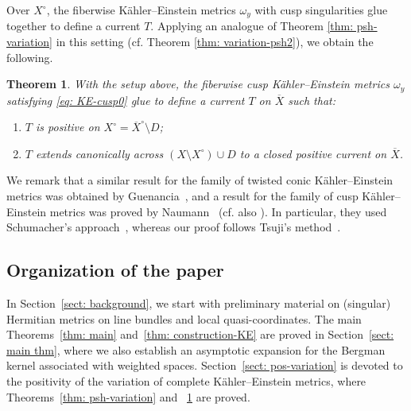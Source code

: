 \documentclass[a4paper, 11pt]{amsart}
\theoremstyle{plain}
\newtheorem{theorem}{Theorem}[section]
\numberwithin{equation}{section} %
\numberwithin{figure}{section} %
\theoremstyle{plain}
\theoremstyle{plain}
\theoremstyle{plain}
\theoremstyle{plain}
\theoremstyle{remark}
\theoremstyle{definition}
\theoremstyle{definition}
\begin{document}
Over $X^\circ$, the fiberwise K\"ahler--Einstein metrics $\omega_y$ with cusp singularities glue together to define a current $T$. Applying an analogue of Theorem \ref{thm: psh-variation} in this setting (cf. Theorem \ref{thm: variation-psh2}), we obtain the following.  %
\begin{theorem}\label{thm:family_cusp} With the setup above, %
   the fiberwise cusp K\"ahler--Einstein metrics $\omega_y$ satisfying \eqref{eq: KE-cusp0} glue to define a current $T$ on $\overline{X}$ such that:
    \begin{enumerate}[label=(\roman*)]
        \item $T$ is positive on $X^\circ = \overline{X}^\circ \setminus D$;
        \item $T$ extends canonically across $(X \setminus X^\circ)\cup D$ to a closed positive current on $\overline{X}$.
    \end{enumerate}
\end{theorem}
We remark that a similar result for the family of twisted conic K\"ahler--Einstein metrics was obtained by Guenancia~\cite{Guenancia_2020}, and a result for the family of cusp K\"ahler--Einstein metrics was proved by Naumann~\cite{Naumann22-positivity} (cf. also \cite[Section 8.1]{Guenancia_2020}). In particular, they used Schumacher’s approach~\cite{Schumacher12-positivity-bundles}, whereas our proof follows Tsuji’s method~\cite{Tsuji10-construction-KE}.  

\subsection*{Organization of the paper} In Section~\ref{sect: background}, we start with preliminary material on (singular) Hermitian metrics on line bundles and local quasi-coordinates. The main Theorems~\ref{thm: main}  and~\ref{thm: construction-KE} are proved in Section~\ref{sect: main thm}, where we also establish an asymptotic expansion for the Bergman kernel associated with weighted spaces. Section~\ref{sect: pos-variation} is devoted to the positivity of the variation of complete K\"ahler--Einstein metrics, where Theorems~\ref{thm: psh-variation} and ~\ref{thm:family_cusp} are proved.
 
\end{document}
